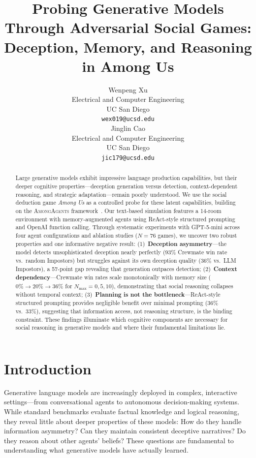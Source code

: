 \documentclass{article}
\title{Probing Generative Models Through Adversarial Social Games:\\ Deception, Memory, and Reasoning in Among Us}
\author{
  Wenpeng Xu \\
  Electrical and Computer Engineering \\
  UC San Diego \\
  \texttt{wex019@ucsd.edu} \\
  \And
  Jinglin Cao \\
  Electrical and Computer Engineering \\
  UC San Diego \\
  \texttt{jic179@ucsd.edu} \\
}
\begin{document}
\maketitle

\begin{abstract}
Large generative models exhibit impressive language production capabilities, but their deeper cognitive properties---deception generation versus detection, context-dependent reasoning, and strategic adaptation---remain poorly understood.
We use the social deduction game \textit{Among Us} as a controlled probe for these latent capabilities, building on the \textsc{AmongAgents} framework~\cite{chi2024amongagents}.
Our text-based simulation features a 14-room environment with memory-augmented agents using ReAct-style structured prompting and OpenAI function calling.
Through systematic experiments with GPT-5-mini across four agent configurations and ablation studies ($N=76$ games), we uncover two robust properties and one informative negative result:
(1)~\textbf{Deception asymmetry}---the model detects unsophisticated deception nearly perfectly (93\% Crewmate win rate vs.\ random Impostors) but struggles against its own deception quality (36\% vs.\ LLM Impostors), a 57-point gap revealing that generation outpaces detection;
(2)~\textbf{Context dependency}---Crewmate win rates scale monotonically with memory size ($0\% \to 20\% \to 36\%$ for $N_{\max} = 0, 5, 10$), demonstrating that social reasoning collapses without temporal context;
(3)~\textbf{Planning is not the bottleneck}---ReAct-style structured prompting provides negligible benefit over minimal prompting (36\% vs.\ 33\%), suggesting that information access, not reasoning structure, is the binding constraint.
These findings illuminate which cognitive components are necessary for social reasoning in generative models and where their fundamental limitations lie.
\end{abstract}

\section{Introduction}

Generative language models are increasingly deployed in complex, interactive settings---from conversational agents to autonomous decision-making systems. While standard benchmarks evaluate factual knowledge and logical reasoning, they reveal little about deeper properties of these models: How do they handle information asymmetry? Can they maintain consistent deceptive narratives? Do they reason about other agents' beliefs? These questions are fundamental to understanding what generative models have actually learned.
\end{document}
